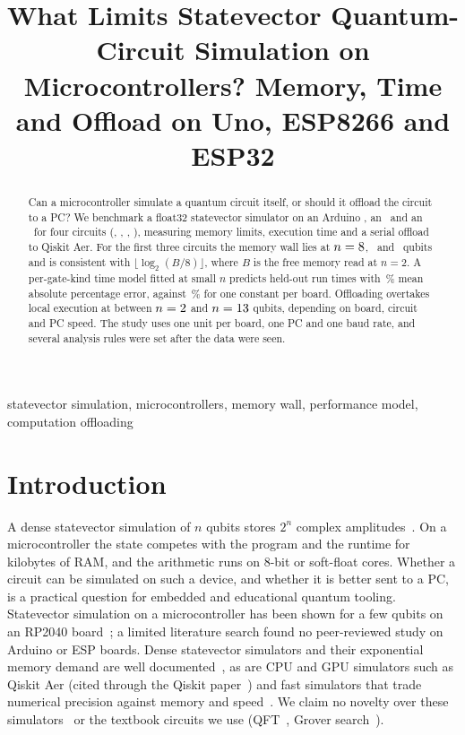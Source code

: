 \documentclass[conference,a4paper,10pt]{IEEEtran}
\begin{document}
\title{What Limits Statevector Quantum-Circuit Simulation on Microcontrollers? Memory, Time and Offload on Uno, ESP8266 and ESP32}
\author{}
\maketitle
\begin{abstract}
Can a microcontroller simulate a quantum circuit itself, or should it offload the circuit to a PC? We benchmark a float32 statevector simulator on an Arduino \uno, an \espA\ and an \espB\ for four circuits (\hall, \bell, \qft, \grover), measuring memory limits, execution time and a serial offload to Qiskit Aer. For the first three circuits the memory wall lies at $n=8$, \MemWallEspLo\ and \MemWallEspHi\ qubits and is consistent with $\lfloor\log_2(B/8)\rfloor$, where $B$ is the free memory read at $n=2$. A per-gate-kind time model fitted at small $n$ predicts held-out run times with \MapeTwoClean\,\% mean absolute percentage error, against \MapeOneClean\,\% for one constant per board. Offloading overtakes local execution at between $n=2$ and $n=13$ qubits, depending on board, circuit and PC speed. The study uses one unit per board, one PC and one baud rate, and several analysis rules were set after the data were seen.
\end{abstract}
\begin{IEEEkeywords}
statevector simulation, microcontrollers, memory wall, performance model, computation offloading
\end{IEEEkeywords}

\section{Introduction}
A dense statevector simulation of $n$ qubits stores $2^n$ complex amplitudes~\cite{haener2017}. On a microcontroller the state competes with the program and the runtime for kilobytes of RAM, and the arithmetic runs on 8-bit or soft-float cores. Whether a circuit can be simulated on such a device, and whether it is better sent to a PC, is a practical question for embedded and educational quantum tooling. Statevector simulation on a microcontroller has been shown for a few qubits on an RP2040 board~\cite{carney2023}; a limited literature search found no peer-reviewed study on Arduino or ESP boards. Dense statevector simulators and their exponential memory demand are well documented~\cite{haener2017}, as are CPU and GPU simulators such as Qiskit Aer (cited through the Qiskit paper~\cite{javadiabhari2024}) and fast simulators that trade numerical precision against memory and speed~\cite{yusufov2023}. We claim no novelty over these simulators~\cite{haener2017,javadiabhari2024,yusufov2023} or the textbook circuits we use (QFT~\cite{coppersmith1994}, Grover search~\cite{grover1996}).
\end{document}
